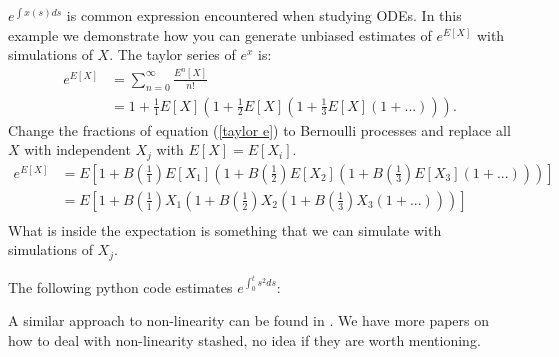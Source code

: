\documentclass[a4paper,12pt]{article}
\begin{document}
\vspace*{0.2cm}
\begin{pythonn}[$y'=y^{2}$]
\end{pythonn}

\begin{example}[$e^{E[X]}$]
    $e^{\int x(s)ds}$ is common expression encountered when studying ODEs.
    In this example we demonstrate how you can generate unbiased estimates of
    $e^{E[X]}$ with simulations of $X$. The taylor series of $e^{x}$ is:
    \begin{align}
        e^{E[X]} & = \sum_{n=0}^{\infty} \frac{E^{n}[X]}{n!}     \\
                 & = 1 + \frac{1}{1}E[X]\left(1+ \frac{1}{2}E[X]
        \left(1+\frac{1}{3}E[X]\left(1+ ...\right)\right)\right). \label{taylor e}
    \end{align}
    Change the fractions of equation (\ref{taylor e}) to Bernoulli processes
    and replace all $X$ with independent $X_j$ with $E[X]=E[X_{i}]$.
    \begin{align*}
        e^{E[X]} & = E
        \left[1 + B\left(\frac{1}{1}\right)E[X_1]
        \left(1+ B\left(\frac{1}{2}\right)E[X_2]
        \left(1+B\left(\frac{1}{3}\right)E[X_3]
        \left(1+ ...\right)
        \right)
        \right)
        \right]              \\
                 & = E\left[
            1 + B\left(\frac{1}{1}\right)X_1
            \left(1+ B\left(\frac{1}{2}\right)X_2
            \left(1+B\left(\frac{1}{3}\right)X_3
            \left(1+ ...\right)
            \right)
            \right)
        \right]              \\
    \end{align*}
    What is inside the expectation is something that we can simulate with simulations of $X_{j}$.
\end{example}

\vspace{0.2cm}
\begin{pythonn}[$e^{E[X]}$]
    The following python code estimates $e^{\int_{0}^{t} s^{2}ds}$:
    \vspace*{0.4cm}
\end{pythonn}

\begin{related}
    A similar approach to non-linearity can be found in \cite{ermakov_monte_2019}.
    We have more papers on how to deal with non-linearity stashed, no idea if they are
    worth mentioning.
\end{related}
\end{document}
